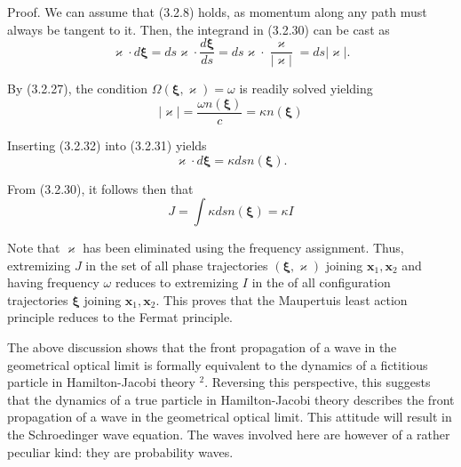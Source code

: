 \documentclass{article}
\begin{document}
Proof. We can assume that (3.2.8) holds, as momentum along any path must always be tangent to it. Then, the integrand in (3.2.30) can be cast as
$$
\begin{equation*}
\varkappa \cdot d \boldsymbol{\xi}=d s \boldsymbol{\varkappa} \cdot \frac{d \boldsymbol{\xi}}{d s}=d s \boldsymbol{\varkappa} \cdot \frac{\boldsymbol{\varkappa}}{|\boldsymbol{\varkappa}|}=d s|\boldsymbol{\varkappa}| . \tag{3.2.31}
\end{equation*}
$$

By (3.2.27), the condition $\Omega(\boldsymbol{\xi}, \boldsymbol{\varkappa})=\omega$ is readily solved yielding
$$
\begin{equation*}
|\varkappa|=\frac{\omega n(\boldsymbol{\xi})}{c}=\kappa n(\boldsymbol{\xi}) \tag{3.2.32}
\end{equation*}
$$

Inserting (3.2.32) into (3.2.31) yields
$$
\begin{equation*}
\varkappa \cdot d \boldsymbol{\xi}=\kappa d s n(\boldsymbol{\xi}) . \tag{3.2.33}
\end{equation*}
$$

From (3.2.30), it follows then that
$$
\begin{equation*}
J=\int \kappa d s n(\boldsymbol{\xi})=\kappa I \tag{3.2.34}
\end{equation*}
$$

Note that $\boldsymbol{\varkappa}$ has been eliminated using the frequency assignment. Thus, extremizing $J$ in the set of all phase trajectories $(\boldsymbol{\xi}, \boldsymbol{\varkappa})$ joining $\boldsymbol{x}_{1}, \boldsymbol{x}_{2}$ and having frequency $\omega$ reduces to extremizing $I$ in the of all configuration trajectories $\boldsymbol{\xi}$ joining $\boldsymbol{x}_{1}, \boldsymbol{x}_{2}$. This proves that the Maupertuis least action principle reduces to the Fermat principle.

The above discussion shows that the front propagation of a wave in the geometrical optical limit is formally equivalent to the dynamics of a fictitious particle
in Hamilton-Jacobi theory ${ }^{2}$. Reversing this perspective, this suggests that the dynamics of a true particle in Hamilton-Jacobi theory describes the front propagation of a wave in the geometrical optical limit. This attitude will result in the Schroedinger wave equation. The waves involved here are however of a rather peculiar kind: they are probability waves.

\end{document}
